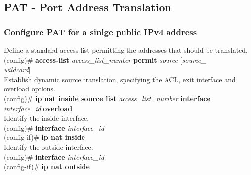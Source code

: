 \subsection{PAT - Port Address Translation}
\subsubsection*{Configure PAT for a sinlge public IPv4 address}
\textrm{Define a standard access list permitting the addresses that should be translated.}\\
(config)\# \textbf{access-list} \textit{access\_list\_number} \textbf{permit} \textit{source} [\textit{source\_\\wildcard}]\vspace{11pt}\\
\textrm{Establish dynamic source translation, specifying the ACL, exit interface and overload options.}\\
(config)\# \textbf{ip nat inside source list} \textit{access\_list\_number} \textbf{interface} \\\textit{interface\_id} \textbf{overload}\vspace{11pt}\\
\textrm{Identify the inside interface.}\\
(config)\# \textbf{interface} \textit{interface\_id}\\
(config-if)\# \textbf{ip nat inside}\vspace{11pt}\\
\textrm{Identify the outside interface.}\\
(config)\# \textbf{interface} \textit{interface\_id}\\
(config-if)\# \textbf{ip nat outside}
